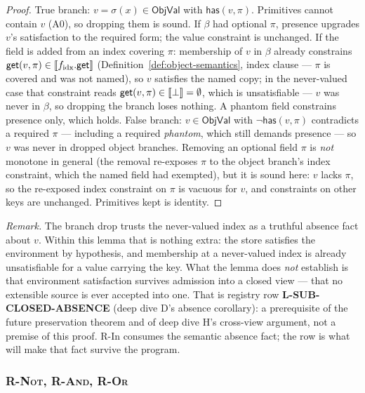 \documentclass[11pt]{article}
\newcommand{\ObjVal}{\mathsf{ObjVal}}
\begin{document}
\begin{lemma}
\label{lem:r-in-sound}
\end{lemma}
\begin{proof}
True branch: $v = \sigma(x) \in \ObjVal$ with $\mathsf{has}(v, \pi)$.
Primitives cannot contain $v$ (A0), so dropping them is sound. If $\beta$
had optional $\pi$, presence upgrades $v$'s satisfaction to the required
form; the value constraint is unchanged. If the field is added from an index
covering $\pi$: membership of $v$ in $\beta$ already constrains
$\mathsf{get}(v,\pi) \in \llbracket f_{\mathrm{idx}}.\mathsf{get} \rrbracket$
(Definition~\ref{def:object-semantics}, index clause — $\pi$ is covered
and was not named), so $v$ satisfies the named copy; in the never-valued
case that constraint reads
$\mathsf{get}(v,\pi) \in \llbracket \bot \rrbracket = \emptyset$, which is unsatisfiable
— $v$ was never in $\beta$, so dropping the branch loses nothing. A
phantom field constrains presence only, which holds.
False branch: $v \in \ObjVal$ with $\neg\mathsf{has}(v,\pi)$ contradicts a
required $\pi$ — including a required \emph{phantom}, which still demands
presence — so $v$ was never in dropped object branches. Removing an optional field
$\pi$ is \emph{not} monotone in general (the removal re-exposes $\pi$ to
the object branch's index constraint, which the named field had exempted), but it
is sound here: $v$ lacks $\pi$, so the re-exposed index constraint on
$\pi$ is vacuous for $v$, and constraints on other keys are unchanged.
Primitives kept is identity.
\end{proof}

\emph{Remark.} The branch drop trusts the never-valued index as a truthful
absence fact about $v$. Within this lemma that is nothing extra: the store
satisfies the environment by hypothesis, and membership at a never-valued
index is already unsatisfiable for a value carrying the key. What the lemma
does \emph{not} establish is that environment satisfaction survives
admission into a closed view — that no extensible source is ever accepted
into one. That is registry row \textbf{L-SUB-CLOSED-ABSENCE} (deep dive D's
absence corollary): a prerequisite of the future preservation theorem and
of deep dive H's cross-view argument, not a premise of this proof. R-In
consumes the semantic absence fact; the row is what will make that fact
survive the program.

\subsubsection{\textsc{R-Not}, \textsc{R-And}, \textsc{R-Or}}
\label{sec:connectives}
\end{document}
